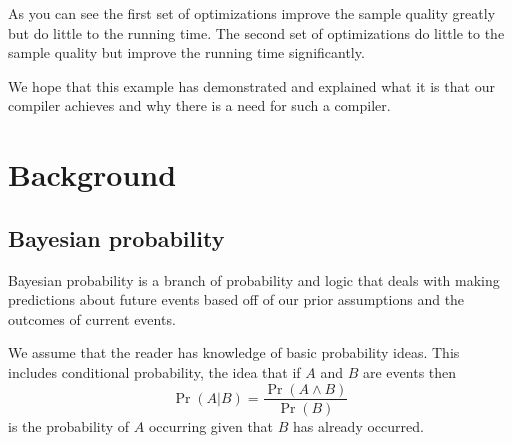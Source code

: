 \documentclass[a4paper]{article}
\begin{document}
As you can see the first set of optimizations improve the sample quality greatly but do little to the running time. The second set of optimizations do little to the sample quality but improve the running time significantly.

We hope that this example has demonstrated and explained what it is that our compiler achieves and why there is a need for such a compiler.




\section{Background}




\subsection{Bayesian probability}

Bayesian probability is a branch of probability and logic that deals with making predictions about future events based off of our prior assumptions and the outcomes of current events.

We assume that the reader has knowledge of basic probability ideas. This includes conditional probability, the idea that if \(A\) and \(B\) are events then
\[\Pr(A | B) = \frac{\Pr(A \land B)}{\Pr(B)}\]
is the probability of \(A\) occurring given that \(B\) has already occurred.
\end{document}
